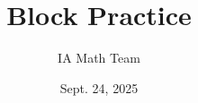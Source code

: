 



\title[Block Practice]{Block Practice}

\author[IA Math Team]{IA Math Team}



\vspace{-2cm}\date{Sept. 24, 2025}

    
    

